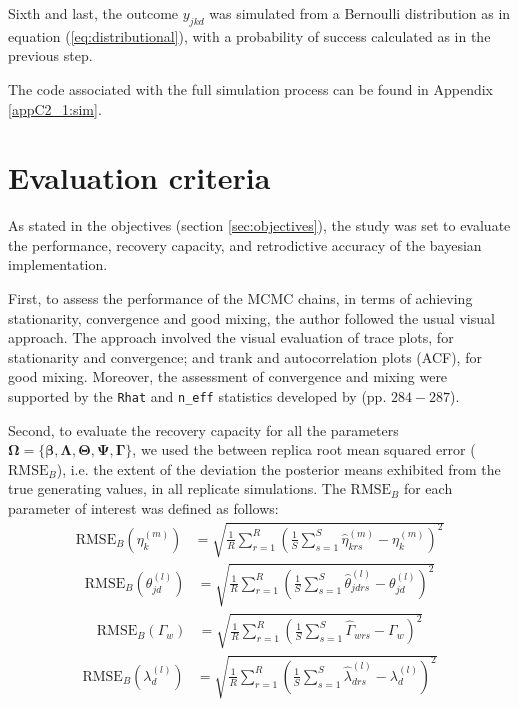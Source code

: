 Sixth and last, the outcome $y_{jkd}$ was simulated from a Bernoulli distribution as in equation (\ref{eq:distributional}), with a probability of success calculated as in the previous step. 

The code associated with the full simulation process can be found in Appendix \ref{appC2_1:sim}.


\section{Evaluation criteria}

As stated in the objectives (section \ref{sec:objectives}), the study was set to evaluate the performance, recovery capacity, and retrodictive accuracy of the bayesian implementation.

First, to assess the performance of the MCMC chains, in terms of achieving stationarity, convergence and good mixing, the author followed the usual visual approach. The approach involved the visual evaluation of trace plots, for stationarity and convergence; and trank and autocorrelation plots (ACF), for good mixing. Moreover, the assessment of convergence and mixing were supported by the \texttt{Rhat} and \texttt{n\_eff} statistics developed by \citet{Gelman_et_al_2014} (pp. $284-287$).

Second, to evaluate the recovery capacity for all the parameters $\pmb{\Omega} = \{ \pmb{\beta}, \pmb{\Lambda}, \pmb{\Theta}, \pmb{\Psi}, \pmb{\Gamma} \}$, we used the between replica root mean squared error ($\text{RMSE}_{B}$), i.e. the extent of the deviation the posterior means exhibited from the true generating values, in all replicate simulations. The $\text{RMSE}_{B}$ for each parameter of interest was defined as follows:
%
\begin{align}
	\text{RMSE}_{B} \left( \eta^{(m)}_{k} \right) &=\sqrt{\frac{1}{R} \sum_{r=1}^{R} \left( \frac{1}{S} \sum_{s=1}^{S} \hat{\eta}^{(m)}_{krs} - \eta^{(m)}_{k} \right)^2}
\end{align}
%
\begin{align}
	\text{RMSE}_{B} \left( \theta^{(l)}_{jd} \right) &=\sqrt{\frac{1}{R} \sum_{r=1}^{R} \left( \frac{1}{S} \sum_{s=1}^{S} \hat{\theta}^{(l)}_{jdrs} - \theta^{(l)}_{jd} \right)^2} 
\end{align}
%
\begin{align}
	\text{RMSE}_{B} \left( \Gamma_{w} \right) &=\sqrt{\frac{1}{R} \sum_{r=1}^{R} \left( \frac{1}{S} \sum_{s=1}^{S} \hat{\Gamma}_{wrs} - \Gamma_{w} \right)^2}
\end{align}
%
\begin{align}
	\text{RMSE}_{B} \left( \lambda^{(l)}_{d} \right) &=\sqrt{\frac{1}{R} \sum_{r=1}^{R} \left( \frac{1}{S} \sum_{s=1}^{S} \hat{\lambda}^{(l)}_{drs} - \lambda^{(l)}_{d} \right)^2}
\end{align}

